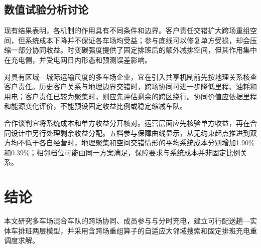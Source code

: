 \documentclass{setp-new}
\newcommand{\setptabsetup}{\fontsize{9pt}{10.5pt}\selectfont\renewcommand{\arraystretch}{0.90}\setlength{\tabcolsep}{2.2pt}\setlength{\aboverulesep}{0.4pt}\setlength{\belowrulesep}{0.4pt}\hbadness=10000}
\newif\ifESevenReady
\begin{document}
\begin{table}[H]
\centering
\caption{完整机制固定全日排班在28个电网日的充电择时复算}
\label{tab:e7-dynamic-charging-replay}
\setptabsetup

\end{table}
\fi

\subsection{数值试验分析讨论}

现有结果表明，各机制的作用具有不同条件和边界。客户责任交错扩大跨场重组空间，但系统成本下降并不保证各车场均受益；参与底线可以修复单方受损，却会压缩一部分协同收益。时变碳强度提供了固定排班后的额外减排空间，但其作用集中在充电侧，并受电网日内形态和预测误差影响。\ifESevenReady 动态订单进一步把三类机制置于同一执行过程中，经济收益、成员参与、充电排放和可执行率不能由一个综合指标替代。\fi

对具有区域—城际运输尺度的多车场企业，宜在引入共享机制前先按地理关系核查客户责任。历史客户关系与地理边界交错时，跨场协同可进一步降低里程、油耗和用电；客户责任已较为聚集时，则应先评估剩余的跨区绕行。协同价值应依据里程和能源变化评价，不能预设固定收益比例或稳定缩减车队。

合作谈判宜将系统成本和单方收益分开核对。运营层面应先核验单方收益，再在合同设计中另行处理剩余收益分配。五档参与保障曲线显示，从无约束起点推进到双方均不低于各自经营时，地理聚集和空间交错情形的平均系统成本分别增加1.90\%和0.39\%；相邻档位可能由同一方案满足，保障要求与系统成本并非固定比例关系。

\ifESevenReady 订单持续变化时，企业宜分别监控全日经营净收益、固定配送任务后的充电排放和各车场收益比，而不以单一综合指标替代三类结果。合作价值还应与可执行率共同评价；在既定计算预算内无法形成可执行延续的机制，不宜用于相应订单强度和响应时限。\fi


\section{结论}

\ifESevenReady 本文研究动态订单下多车场混合车队的跨场协同、成员参与与分时充电，建立可行配送趟—实体车排班两层模型，并采用含跨场重组算子的自适应大邻域搜索和固定排班充电重调度求解。\else 本文研究多车场混合车队的跨场协同、成员参与与分时充电，建立可行配送趟—实体车排班两层模型，并采用含跨场重组算子的自适应大邻域搜索和固定排班充电重调度求解。\fi
\end{document}
